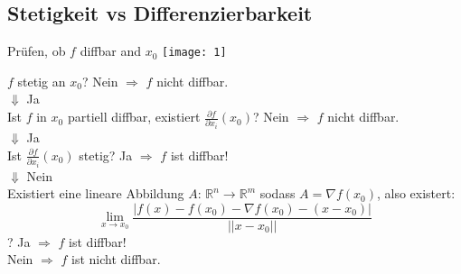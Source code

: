 \subsection{Stetigkeit vs Differenzierbarkeit}


\begin{Rezept}{Prüfen, ob $f$ diffbar and $x_0$}{}
    \texttt{[image: 1]}
    
    $f$ stetig an $x_0$? Nein $\Rightarrow$ $f$ nicht diffbar.\\
	$\Downarrow$ Ja\\
	Ist $f$ in $x_0$ partiell diffbar, existiert $\frac{\partial f}{\partial x_i}(x_0)$? Nein $\Rightarrow$ $f$ nicht diffbar.\\
	$\Downarrow$ Ja\\
	Ist $\frac{\partial f}{\partial x_i}(x_0)$ stetig? Ja $\Rightarrow$ $f$ ist diffbar!\\
	$\Downarrow$ Nein\\
	Existiert eine lineare Abbildung $A$: $\mathbb{R}^n \rightarrow \mathbb{R}^m$ sodass $A=\nabla f(x_0)$, also existert:
	\[
    	\lim_{x\rightarrow x_0} \frac{|f(x)-f(x_0)-\nabla f(x_0) - (x-x_0)|}{||x-x_0||}
	\]?
	Ja $\Rightarrow$ $f$ ist diffbar!\\
	Nein $\Rightarrow$ $f$ ist nicht diffbar.
\end{Rezept}
